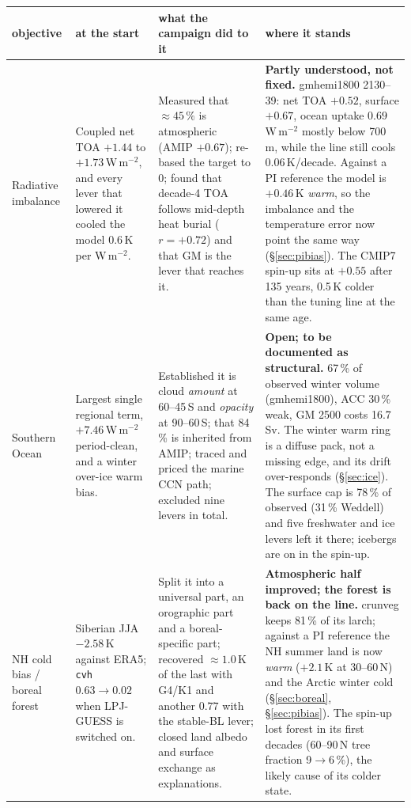 \documentclass[10pt]{article}
\begin{document}
\begin{center}\small
\begin{tabular}{p{2.5cm}p{4.3cm}p{4.3cm}p{4.3cm}}
\toprule
objective & at the start & what the campaign did to it & where it stands \\
\midrule
Radiative imbalance &
Coupled net TOA $+1.44$ to $+1.73$\,W\,m$^{-2}$, and every lever that lowered it cooled the
model $0.6$\,K per W\,m$^{-2}$. &
Measured that ${\approx}45\,\%$ is atmospheric (AMIP $+0.67$); re-based the target to $0$;
found that decade-4 TOA follows mid-depth heat burial ($r=+0.72$) and that GM is the lever
that reaches it. &
\textbf{Partly understood, not fixed.} gmhemi1800 2130--39: net TOA $+0.52$, surface
$+0.67$, ocean uptake $0.69$\,W\,m$^{-2}$ mostly below 700\,m, while the line still cools
$0.06$\,K/decade. Against a PI reference the model is $+0.46$\,K \emph{warm}, so the imbalance
and the temperature error now point the same way (\S\ref{sec:pibias}). The CMIP7 spin-up sits at
$+0.55$ after 135 years, 0.5\,K colder than the tuning line at the same age. \\
\addlinespace
Southern Ocean &
Largest single regional term, $+7.46$\,W\,m$^{-2}$ period-clean, and a winter over-ice warm
bias. &
Established it is cloud \emph{amount} at 60--45\,S and \emph{opacity} at 90--60\,S; that
84\,\% is inherited from AMIP; traced and priced the marine CCN path; excluded nine levers
in total. &
\textbf{Open; to be documented as structural.} 67\,\% of observed winter volume
(gmhemi1800), ACC 30\,\% weak, GM 2500 costs 16.7\,Sv. The winter warm ring is a diffuse pack,
not a missing edge, and its drift over-responds (\S\ref{sec:ice}). The surface cap is 78\,\% of
observed (31\,\% Weddell) and five freshwater and ice levers left it there; icebergs are on in the
spin-up. \\
\addlinespace
NH cold bias / boreal forest &
Siberian JJA $-2.58$\,K against ERA5; \texttt{cvh} $0.63\to0.02$ when LPJ-GUESS is switched
on. &
Split it into a universal part, an orographic part and a boreal-specific part; recovered
${\approx}1.0$\,K of the last with G4/K1 and another $0.77$ with the stable-BL lever;
closed land albedo and surface exchange as explanations. &
\textbf{Atmospheric half improved; the forest is back on the line.} crunveg keeps 81\,\% of
its larch; against a PI reference the NH summer land is now \emph{warm} ($+2.1$\,K at
30--60\,N) and the Arctic winter cold (\S\ref{sec:boreal}, \S\ref{sec:pibias}). The spin-up lost
forest in its first decades (60--90\,N tree fraction 9$\to$6\,\%), the likely cause of its colder
state. \\
\bottomrule
\end{tabular}
\end{center}
\end{document}
